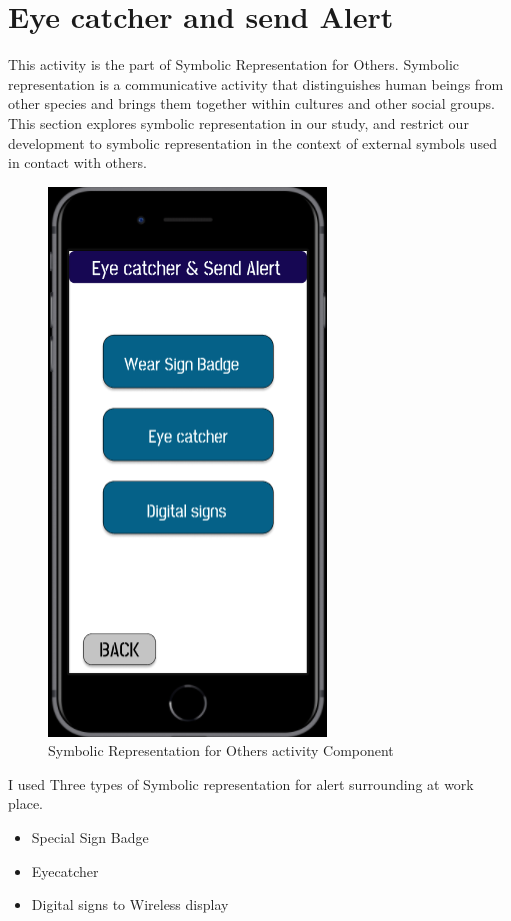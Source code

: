 \section{Eye catcher and send Alert}
This activity is the part of Symbolic Representation for Others. Symbolic representation is a communicative activity that distinguishes human beings from other species and brings them together within cultures and other social groups. This section explores symbolic representation in our study, and restrict our development to symbolic representation in the context of external symbols used in contact with others.
\begin{figure}[hbt!] 
  \centering
  \includegraphics[width=0.4\linewidth]{chap4/image4/eye.png}
  \caption[Symbolic Representation for Others activity Component ]{Symbolic Representation for Others activity Component}
  \label{fig:Sign}
\end{figure}
I used Three types of Symbolic representation for alert surrounding at work place.
\begin{itemize}
    \item Special Sign Badge
    \item Eyecatcher
    \item Digital signs to Wireless display
\end{itemize}

